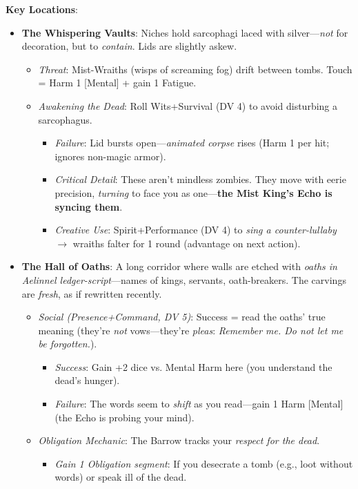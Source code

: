 \documentclass[12pt]{article}
\begin{document}
\textbf{Key Locations}:
\begin{itemize}
  \item \textbf{The Whispering Vaults}: Niches hold sarcophagi laced with silver---\textit{not} for decoration, but to \textit{contain}. Lids are slightly askew.
  \begin{itemize}
    \item \textit{Threat}: Mist-Wraiths (wisps of screaming fog) drift between tombs. Touch = Harm 1 [Mental] + gain 1 Fatigue.
    \item \textit{Awakening the Dead}: Roll Wits+Survival (DV 4) to avoid disturbing a sarcophagus.
    \begin{itemize}
      \item \textit{Failure}: Lid bursts open---\textit{animated corpse} rises (Harm 1 per hit; ignores non-magic armor).
      \item \textit{Critical Detail}: These aren't mindless zombies. They move with eerie precision, \textit{turning} to face you as one---\textbf{the Mist King's Echo is syncing them}.
      \item \textit{Creative Use}: Spirit+Performance (DV 4) to \textit{sing a counter-lullaby} $\rightarrow$ wraiths falter for 1 round (advantage on next action).
    \end{itemize}
  \end{itemize}
  \item \textbf{The Hall of Oaths}: A long corridor where walls are etched with \textit{oaths in Aelinnel ledger-script}---names of kings, servants, oath-breakers. The carvings are \textit{fresh}, as if rewritten recently.
  \begin{itemize}
    \item \textit{Social (Presence+Command, DV 5)}: Success = read the oaths' true meaning (they're \textit{not} vows---they're \textit{pleas}: \textit{Remember me. Do not let me be forgotten.}).
    \begin{itemize}
      \item \textit{Success}: Gain +2 dice vs. Mental Harm here (you understand the dead's hunger).
      \item \textit{Failure}: The words seem to \textit{shift} as you read---gain 1 Harm [Mental] (the Echo is probing your mind).
    \end{itemize}
    \item \textit{Obligation Mechanic}: The Barrow tracks your \textit{respect for the dead}.
    \begin{itemize}
      \item \textit{Gain 1 Obligation segment}: If you desecrate a tomb (e.g., loot without words) or speak ill of the dead.

\end{itemize}
\end{itemize}
\end{itemize}
\end{document}
